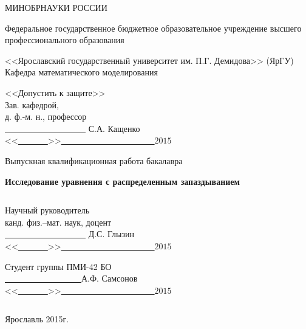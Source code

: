 \titlepage
\Large
\begin{center}
МИНОБРНАУКИ РОССИИ	

\large{Федеральное государственное бюджетное образовательное учреждение высшего профессионального образования}
\Large

<<Ярославский государственный университет им. П.Г. Демидова>> (ЯрГУ)
\[\]
Кафедра математического моделирования
\begin{flushright}
<<Допустить к защите>>\\Зав. кафедрой,\\д. ф.-м. н., профессор\\ \underline{\ \ \ \ \ \ \ \ \ \ \ \ \ \ \ \ \ \ \ } С.А. Кащенко\\ <<\underline{\ \ \ \ \ \ \ }>>\underline{\ \ \ \ \ \ \ \ \ \ \ \ \ \ \ \ \ \ \ \ \ \ }$2015$
\end{flushright} 
\[\]\[\]
Выпускная квалификационная работа бакалавра

\bigskip
\textbf{Исследование уравнения с распределенным запаздыванием}
\end{center}
\[\]\[\]\[\]\[\]\[\]
\begin{flushright}
Научный руководитель\\канд. физ.--мат. наук, доцент\\ \underline{\ \ \ \ \ \ \ \ \ \ \ \ \ \ \ \ \ \ \ } Д.С. Глызин\\ <<\underline{\ \ \ \ \ \ \ }>>\underline{\ \ \ \ \ \ \ \ \ \ \ \ \ \ \ \ \ \ \ \ \ \ }$2015$
\end{flushright}

\begin{flushright}
Студент группы ПМИ-42 БО\\ \underline{\ \ \ \ \ \ \ \ \ \ \ \ \ \ \ \ \ \ }А.Ф. Самсонов\\ <<\underline{\ \ \ \ \ \ \ }>>\underline{\ \ \ \ \ \ \ \ \ \ \ \ \ \ \ \ \ \ \ \ \ \ }$2015$
\end{flushright}
\[\]\[\]
\begin{center}
Ярославль 2015г.
\end{center}